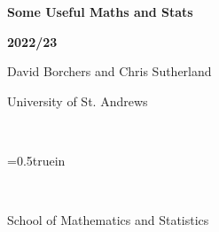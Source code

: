 \documentclass[12pt]{article}
\begin{document}
\abovedisplayskip 0.0in
\belowdisplayskip 0.0in

\centerline{\LARGE \bfseries Some Useful Maths and Stats} \vspace*{2 truemm}
\centerline{\Large \bfseries 2022/23}

\vspace*{10 truemm}

\begin{center}
David Borchers and Chris Sutherland
\end{center}

\vspace*{70 truemm}

\begin{center}
{\sc \Large University of St. Andrews }

~

\epsfxsize=0.5truein

~

{\sc \Large School of Mathematics and Statistics}
\end{center}

\newpage

\tableofcontents

\newpage

\setcounter{page}{1}
\setcounter{equation}{1}







\pagestyle{empty}

\clearpage

%

%

%
%

%
%
\end{document}
